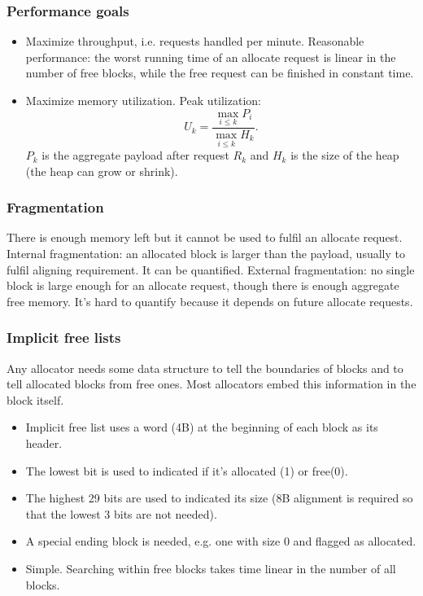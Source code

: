 \subsubsection{Performance goals}
\begin{itemize}
	\item Maximize throughput, i.e. requests handled per minute. Reasonable performance: the worst running time of an allocate request is linear in the number of free blocks, while the free request can be finished in constant time.
	\item Maximize memory utilization. Peak utilization:
	$$U_k=\frac{\max_{i\le k}P_i}{\max_{i\le k}H_k}.$$
	$P_k$ is the aggregate payload after request $R_k$ and $H_k$ is the size of the heap (the heap can grow or shrink).
\end{itemize}
\subsubsection{Fragmentation}
There is enough memory left but it cannot be used to fulfil an allocate request. Internal fragmentation: an allocated block is larger than the payload, usually to fulfil aligning requirement. It can be quantified. External fragmentation: no single block is large enough for an allocate request, though there is enough aggregate free memory. It's hard to quantify because it depends on future allocate requests.
\subsubsection{Implicit free lists}
Any allocator needs some data structure to tell the boundaries of blocks and  to tell allocated blocks from free ones. Most allocators embed this information in the block itself. 
\begin{itemize}
\item Implicit free list uses a word (4B) at the beginning of each block as its header. 
\item The lowest bit is used to indicated if it's allocated (1) or free(0).
\item The highest 29 bits are used to indicated its size (8B alignment is required so that the lowest 3 bits are not needed).
\item A special ending block is needed, e.g. one with size 0 and flagged as allocated.
\item Simple. Searching within free blocks takes time linear in the number of all blocks.
\end{itemize}
